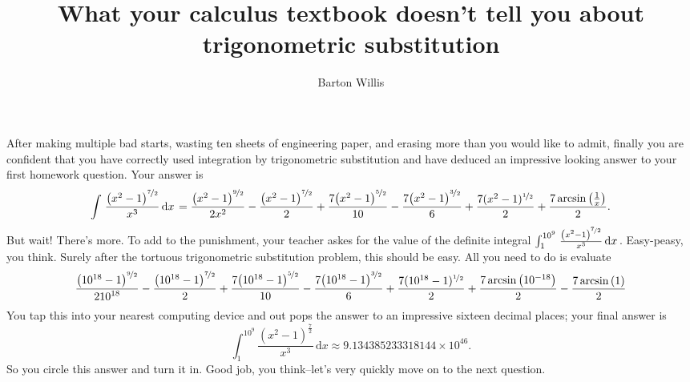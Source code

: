 \documentclass[12pt,fleqn]{article}
\title{What your calculus textbook doesn't tell you about trigonometric substitution}
\author{Barton Willis}
\newcounter{ex}\setcounter{ex}{0}
\begin{document}
\maketitle

After making multiple bad starts, wasting ten sheets of engineering paper, 
 and erasing more  than you would like to admit, finally you are confident 
 that you have correctly used integration by trigonometric substitution and have
 deduced an impressive looking answer to your first homework question. Your answer
 is
 \begin{equation*}
    \int {\left. \frac{{{\left( {{x}^{2}}-1\right) }^{\nicefrac{7}{2}}}}{{{x}^{3}}} \, \mathrm{d}x\right.}=\frac{{{\left( {{x}^{2}}-1\right) }^{\nicefrac{9}{2}}}}{2 {{x}^{2}}}-\frac{{{\left( {{x}^{2}}-1\right) }^{\nicefrac{7}{2}}}}{2}+\frac{7 {{\left( {{x}^{2}}-1\right) }^{\nicefrac{5}{2}}}}{10}-\frac{7 {{\left( {{x}^{2}}-1\right) }^{\nicefrac{3}{2}}}}{6}+\frac{7 (x^2-1)^{\nicefrac{1}{2}}}{2}+\frac{7 \operatorname{arcsin}\left( \frac{1}{x}\right) }{2}.
\end{equation*}
But wait! There's more. To add to the punishment, your teacher askes for the value of  
the definite integral $\int_1^{10^9} {\left. \frac{{{\left( {{x}^{2}}-1\right) }^{\nicefrac{7}{2}}}}{{{x}^{3}}} \, \mathrm{d}x\right.}$. Easy-peasy, you think.
Surely after the tortuous trigonometric substitution problem, this should be easy. 
All you need to do is evaluate
\begin{equation*}
  \frac{{{\left( {{10}^{18}}-1\right) }^{\nicefrac{9}{2}}}}{2 {{10}^{18}}}-\frac{{{\left( {{10}^{18}}-1\right) }^{\nicefrac{7}{2}}}}{2}+\frac{7 {{\left( {{10}^{18}}-1\right) }^{\nicefrac{5}{2}}}}{10}-\frac{7 {{\left( {{10}^{18}}-1\right) }^{\nicefrac{3}{2}}}}{6}+\frac{7 (10^{18}-1)^{\nicefrac{1}{2}}}{2}+\frac{7 \operatorname{arcsin}\left( 10^{-18}\right) }{2}
    - \frac{7 \operatorname{arcsin}\left( 1 \right) }{2}
\end{equation*}
You tap this into your nearest computing device and out  pops the answer to an 
impressive sixteen decimal places; your final answer is
\begin{equation*}
    \int_1^{10^9} {\left. \frac{{{\left( {{x}^{2}}-1\right) }^{\frac{7}{2}}}}{{{x}^{3}}} \, \mathrm{d}x\right.}
       \approx 9.134385233318144 \times {{10}^{46}}.
\end{equation*}
So you circle this answer and turn it in. Good job, you think--let's very quickly move on to the 
next question.
\end{document}

